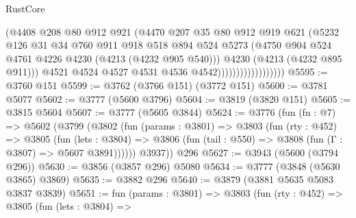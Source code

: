 \begin{lexlean}{RustCore}
\begin{coremodule}
                                    (@4408
                                      @208
                                      @80
                                      @912
                                      @921
                                      (@4470
                                        @207
                                        @35
                                        @80
                                        @912
                                        @919
                                        @621
                                        (@5232
                                          @126
                                          @31
                                          @34
                                          @760
                                          @911
                                          @918
                                          @518
                                          @894
                                          @524
                                          @5273
                                          (@4750
                                            @904
                                            @524
                                            @4761
                                            @4226
                                            @4230
                                            (@4213 (@4232 @905 @540)))
                                          @4230
                                          (@4213 (@4232 @895 @911)))
                                        @4521
                                        @4524
                                        @4527
                                        @4531
                                        @4536
                                        @4542))))))))))))))))))
@5595 := @3760 @151
@5599 := @3762 (@3766 @151) (@3772 @151)
@5600 := @3781 @5077
@5602 := @3777 (@5600 @3796)
@5604 := @3819 (@3820 @151)
@5605 := @3815 @5604
@5607 := @3777 (@5605 @3844)
@5624 := @3776
    (fun (fn : @7) =>
    @5602
      (@3799
        (@3802
          (fun (params : @3801) =>
          @3803
            (fun (rty : @452) =>
            @3805
              (fun (lets : @3804) =>
              @3806 (fun (tail : @550) => @3808 (fun (Γ : @3807) => @5607 @3891))))))
        @3937))
    @296
@5627 := @3943 (@5600 (@3794 @296))
@5630 := @3856 (@3857 @296) @5080
@5634 := @3777 (@3848 (@5630 @3865) @3869)
@5635 := @3882 @296
@5640 := @3879 (@3881 @5635 @5083 @3837 @3839)
@5651 := fun (params : @3801) =>
  @3803
    (fun (rty : @452) =>
    @3805
      (fun (lets : @3804) =>

\end{coremodule}
\end{lexlean}
